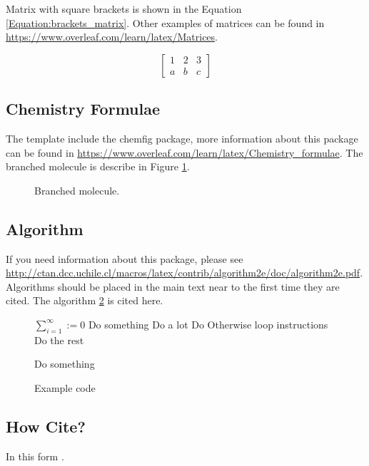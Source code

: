 Matrix with square brackets is shown in the Equation \ref{Equation:brackets_matrix}. Other examples of matrices can be found in \url{https://www.overleaf.com/learn/latex/Matrices}.

\begin{equation}
\label{Equation:brackets_matrix}
\begin{bmatrix}
1 & 2 & 3\\
a & b & c
\end{bmatrix}
\end{equation}


\subsection{Chemistry Formulae}

The template include the chemfig package, more information about this package can be found in \url{https://www.overleaf.com/learn/latex/Chemistry_formulae}. The branched molecule is describe in Figure \ref{Figure:branched_molecule}.


\begin{figure}[H]
\label{Figure:branched_molecule}
\centering
{}
\caption{Branched molecule.}
\end{figure}






\subsection{Algorithm}

If you need information about this package, please see \url{http://ctan.dcc.uchile.cl/macros/latex/contrib/algorithm2e/doc/algorithm2e.pdf}. Algorithms should be placed in the main text near to the first time they are cited. The algorithm \ref{algorithm:example} is cited here.

\begin{figure}[htb]

\centering
\begin{minipage}{0.7\linewidth}
\begin{algorithm}[H]
\label{algorithm:example}
    \DontPrintSemicolon
      
    $\sum_{i=1}^{\infty} := 0$ 
    {
        Do something    
        {
            Do a lot
        }
    }
    {
        Do Otherwise \;
        { 
        	loop instructions \;
        }
    }
    \Else
    {
    	Do the rest
    }
        
    {
        Do something\;
    }
\caption{Example code}
\end{algorithm}
\end{minipage}
\end{figure}

\subsection{How Cite?}

In this form \cite{adams1995hitchhiker}.